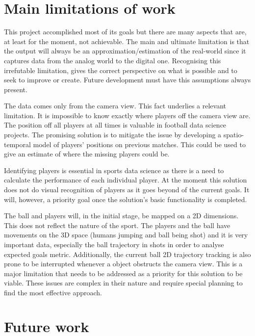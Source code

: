 \documentclass[
    11pt,
    twoside
]{report}
\begin{document}
\section{Main limitations of work}


This project accomplished most of its goals but there are many aspects that are, at least for the moment, not achievable. The main and ultimate limitation is that the output will always be an approximation/estimation of the real-world since it captures data from the analog world to the digital one. Recognising this irrefutable limitation, gives the correct perspective on what is possible and to seek to improve or create. Future development must have this assumptions always present.


The data comes only from the camera view. This fact underlies a relevant limitation. It is impossible to know exactly where players off the camera view are. The position off all players at all times is valuable in football data science projects. The promising solution is to mitigate the issue by developing a spatio-temporal model of players' positions on previous matches. This could be used to give an estimate of where the missing players could be.


Identifying players is essential in sports data science as there is a need to calculate the performance of each individual player. At the moment this solution does not do visual recognition of players as it goes beyond of the current goals. It will, however, a priority goal once the solution's basic functionality is completed.


The ball and players will, in the initial stage, be mapped on a 2D dimensions. This does not reflect the nature of the sport. The players and the ball have movements on the 3D space (humans jumping and ball being shot) and it is very important data, especially the ball trajectory in shots in order to analyse expected goals metric. Additionally, the current ball 2D trajectory tracking is also prone to be interrupted whenever a object obstructs the camera view. This is a major limitation that needs to be addressed as a priority for this solution to be viable. These issues are complex in their nature and require special planning to find the most effective approach.




\section{Future work}
\end{document}

